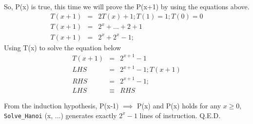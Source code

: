 \documentclass[a4paper, 11pt]{article}
\begin{document}
	So, P(x) is true, this time we will prove the P(x+1) by using the equations above.
	\begin{eqnarray}
	T(x+1) &=& 2T(x)+1; T(1) = 1; T(0) = 0\\
	T(x+1) &=& 2^{x} + ... + 2 + 1\\
	T(x+1) &=& 2^{x} + 2^x - 1;
	\end{eqnarray} 
	Using T(x) to solve the equation below\\
	\begin{eqnarray}
	T(x+1) &=& 2^{x+1} - 1\\
	LHS &=& 2^{x+1} - 1;T(x+1)\\
	RHS &=& 2^{x+1} - 1;\\
	LHS &\equiv& RHS
	\end{eqnarray}
	
	From the induction hypothesis, P(x-1) $\implies$ P(x) and P(x) holds for any $x \geq 0$, \texttt{Solve\_Hanoi} (x, ...) generates exactly $2^x-1$ lines of instruction. Q.E.D.\\
	
\end{document}
